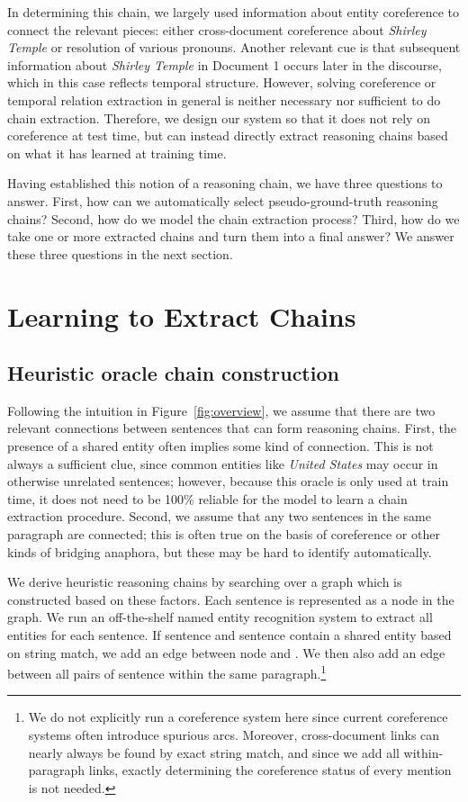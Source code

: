 \documentclass[11pt,a4paper]{article}
\begin{document}
In determining this chain, we largely used information about entity coreference to connect the relevant pieces: either cross-document coreference about \emph{Shirley Temple} or resolution of various pronouns. Another relevant cue is that subsequent information about \emph{Shirley Temple} in Document 1 occurs later in the discourse, which in this case reflects temporal structure. However, solving coreference or temporal relation extraction in general is neither necessary nor sufficient to do chain extraction. Therefore, we design our system so that it does not rely on coreference at test time, but can instead directly extract reasoning chains based on what it has learned at training time.

Having established this notion of a reasoning chain, we have three questions to answer. First, how can we automatically select pseudo-ground-truth reasoning chains? Second, how do we model the chain extraction process? Third, how do we take one or more extracted chains and turn them into a final answer? We answer these three questions in the next section.

\section{Learning to Extract Chains}

\subsection{Heuristic oracle chain construction}

Following the intuition in Figure~\ref{fig:overview}, we assume that there are two relevant connections between sentences that can form reasoning chains. First, the presence of a shared entity often implies some kind of connection. This is not always a sufficient clue, since common entities like \emph{United States} may occur in otherwise unrelated sentences; however, because this oracle is only used at train time, it does not need to be 100\% reliable for the model to learn a chain extraction procedure. Second, we assume that any two sentences in the same paragraph are connected; this is often true on the basis of coreference or other kinds of bridging anaphora, but these may be hard to identify automatically.

We derive heuristic reasoning chains by searching over a graph which is constructed based on these factors. Each sentence  is represented as a node  in the graph. We run an off-the-shelf named entity recognition system to extract all entities for each sentence. If sentence  and sentence  contain a shared entity based on string match, we add an edge between node  and . We then also add an edge between all pairs of sentence within the same paragraph.\footnote{We do not explicitly run a coreference system here since current coreference systems often introduce spurious arcs. Moreover, cross-document links can nearly always be found by exact string match, and since we add all within-paragraph links, exactly determining the coreference status of every mention is not needed.}
\end{document}
